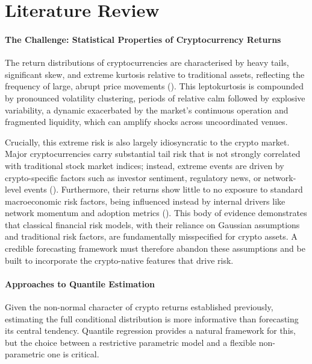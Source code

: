 \documentclass[
  a4paper,
  DIV=11,
  numbers=noendperiod]{scrreprt}
\begin{document}

\chapter{Literature Review}\label{literature-review}

\subsubsection{The Challenge: Statistical Properties of Cryptocurrency
Returns}\label{the-challenge-statistical-properties-of-cryptocurrency-returns}

The return distributions of cryptocurrencies are characterised by heavy
tails, significant skew, and extreme kurtosis relative to traditional
assets, reflecting the frequency of large, abrupt price movements
(). This
leptokurtosis is compounded by pronounced volatility clustering, periods
of relative calm followed by explosive variability, a dynamic
exacerbated by the market's continuous operation and fragmented
liquidity, which can amplify shocks across uncoordinated venues.

Crucially, this extreme risk is also largely idiosyncratic to the crypto
market. Major cryptocurrencies carry substantial tail risk that is not
strongly correlated with traditional stock market indices; instead,
extreme events are driven by crypto-specific factors such as investor
sentiment, regulatory news, or network-level events
(). Furthermore, their returns show
little to no exposure to standard macroeconomic risk factors, being
influenced instead by internal drivers like network momentum and
adoption metrics (). This
body of evidence demonstrates that classical financial risk models, with
their reliance on Gaussian assumptions and traditional risk factors, are
fundamentally misspecified for crypto assets. A credible forecasting
framework must therefore abandon these assumptions and be built to
incorporate the crypto-native features that drive risk.

\subsubsection{Approaches to Quantile
Estimation}\label{approaches-to-quantile-estimation}

Given the non-normal character of crypto returns established previously,
estimating the full conditional distribution is more informative than
forecasting its central tendency. Quantile regression provides a natural
framework for this, but the choice between a restrictive parametric
model and a flexible non-parametric one is critical.
\end{document}
